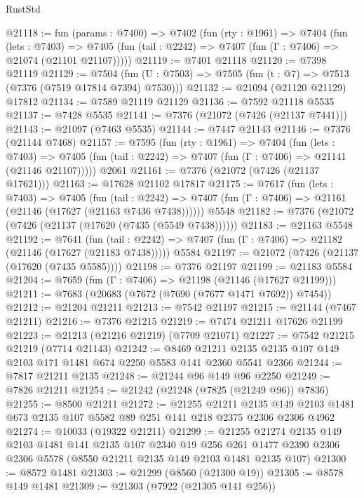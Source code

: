 \begin{lexlean}{RustStd}
\begin{coremodule}
@21118 := fun (params : @7400) =>
  @7402
    (fun (rty : @1961) =>
    @7404
      (fun (lets : @7403) =>
      @7405 (fun (tail : @2242) => @7407 (fun (Γ : @7406) => @21074 (@21101 @21107)))))
@21119 := @7401 @21118
@21120 := @7398 @21119
@21129 := @7504
    (fun (U : @7503) => @7505 (fun (t : @7) => @7513 (@7376 (@7519 @17814 @7394) @7530)))
@21132 := @21094 (@21120 @21129) @17812
@21134 := @7589 @21119 @21129
@21136 := @7592 @21118 @5535
@21137 := @7428 @5535
@21141 := @7376 (@21072 (@7426 (@21137 @7441)))
@21143 := @21097 (@7463 @5535)
@21144 := @7447 @21143
@21146 := @7376 (@21144 @7468)
@21157 := @7595
    (fun (rty : @1961) =>
    @7404
      (fun (lets : @7403) =>
      @7405 (fun (tail : @2242) => @7407 (fun (Γ : @7406) => @21141 (@21146 @21107)))))
    @2061
@21161 := @7376 (@21072 (@7426 (@21137 @17621)))
@21163 := @17628 @21102 @17817
@21175 := @7617
    (fun (lets : @7403) =>
    @7405
      (fun (tail : @2242) =>
      @7407 (fun (Γ : @7406) => @21161 (@21146 (@17627 (@21163 @7436 @7438))))))
    @5548
@21182 := @7376 (@21072 (@7426 (@21137 (@17620 (@7435 (@5549 @7438))))))
@21183 := @21163 @5548
@21192 := @7641
    (fun (tail : @2242) => @7407 (fun (Γ : @7406) => @21182 (@21146 (@17627 (@21183 @7438)))))
    @5584
@21197 := @21072 (@7426 (@21137 (@17620 (@7435 @5585))))
@21198 := @7376 @21197
@21199 := @21183 @5584
@21204 := @7659 (fun (Γ : @7406) => @21198 (@21146 (@17627 @21199)))
@21211 := @7683 (@20683 (@7672 (@7690 (@7677 @1471 @7692)) @7454))
@21212 := @21204 @21211
@21213 := @7542 @21197
@21215 := @21144 (@7467 @21211)
@21216 := @7376 @21215
@21219 := @7474 @21211 @17626 @21199
@21223 := @21213 (@21216 @21219) (@7709 @21071)
@21227 := @7542 @21215 @21219 (@7714 @21143)
@21242 := @8469
    @21211
    @2135
    @2135
    @107
    @149
    @2103
    @171
    @1481
    @674
    @2250
    @5583
    @141
    @2360
    @5541
    @2366
@21244 := @7817 @21211 @2135
@21248 := @21244 @96 @149 @96 @2250
@21249 := @7826 @21211
@21254 := @21242 (@21248 (@7825 (@21249 @96)) @7836)
@21255 := @8500 @21211
@21272 := @21255
    @21211
    @2135
    @149
    @2103
    @1481
    @673
    @2135
    @107
    @5582
    @89
    @251
    @141
    @218
    @2375
    @2306
    @2306
    @4962
@21274 := @10033 (@19322 @21211)
@21299 := @21255
    @21274
    @2135
    @149
    @2103
    @1481
    @141
    @2135
    @107
    @2340
    @19
    @256
    @261
    @1477
    @2390
    @2306
    @2306
    @5578
    (@8550 @21211 @2135 @149 @2103 @1481 @2135 @107)
@21300 := @8572 @1481
@21303 := @21299 (@8560 (@21300 @19))
@21305 := @8578 @149 @1481
@21309 := @21303 (@7922 (@21305 @141 @256))

\end{coremodule}
\end{lexlean}
